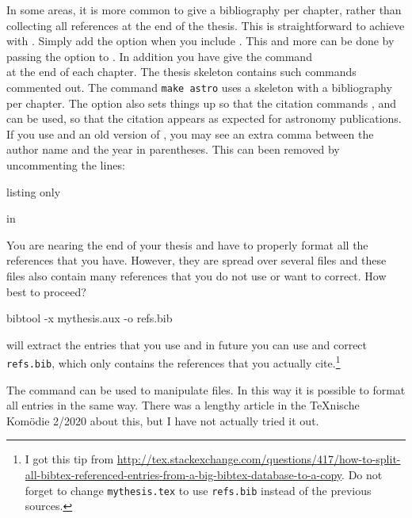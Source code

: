 In some areas, it is more common to give a bibliography per chapter,
rather than collecting all references at the end of the thesis.
This is straightforward to achieve with .
Simply add the option  when you include .
This and more can be done by passing the option  to .
In addition you have give the command\\
 at the end of each chapter.
The thesis skeleton contains such commands commented out.
The command \texttt{make astro} uses a skeleton with a bibliography per chapter.
The option  also sets things up so that the  citation
commands ,  and  can be used,
so that the citation appears as expected for astronomy publications.
If you use  and an old version of ,
you may see an extra comma between the author name and the year in parentheses.
This can been removed by uncommenting the lines:
\begin{tcblisting}{listing only}
\end{tcblisting}
\noindent in 

You are nearing the end of your thesis and have to properly format all
the references that you have. However, they are spread over several
files and these files also contain many references that you do not use
or want to correct. How best to proceed?
\begin{bashlisting}
bibtool -x mythesis.aux -o refs.bib
\end{bashlisting}
\noindent will extract the entries that you use and in future you can use and
correct \texttt{refs.bib}, which only contains the references that you
actually cite.\footnote{%
I got this tip from
\url{http://tex.stackexchange.com/questions/417/how-to-split-all-bibtex-referenced-entries-from-a-big-bibtex-database-to-a-copy}.
Do not forget to change \texttt{mythesis.tex} to use
\texttt{refs.bib} instead of the previous sources.}

The  command can be used to manipulate  files.
In this way it is possible to format all entries in the same way.
There was a lengthy article in the \TeX nische Komödie 2/2020 about this,
but I have not actually tried it out.

